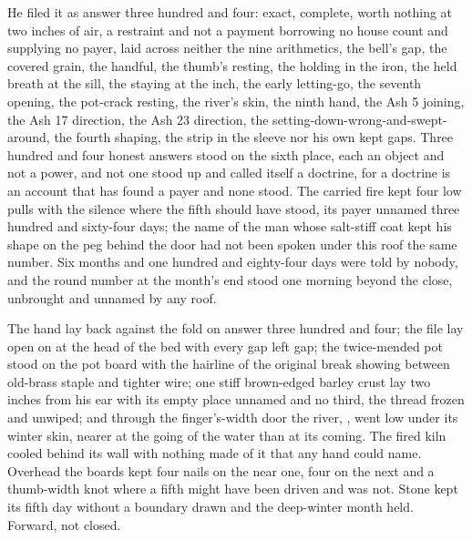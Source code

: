 He filed it as answer three hundred and four: exact, complete, worth nothing at two inches of air, a restraint and not a payment borrowing no house count and supplying no payer, laid across neither the nine arithmetics, the bell's gap, the covered grain, the handful, the thumb's resting, the holding in the iron, the held breath at the sill, the staying at the inch, the early letting-go, the seventh opening, the pot-crack resting, the river's skin, the ninth hand, the Ash 5 joining, the Ash 17 direction, the Ash 23 direction, the setting-down-wrong-and-swept-around, the fourth shaping, the strip in the sleeve nor his own kept gaps. Three hundred and four honest answers stood on the sixth place, each an object and not a power, and not one stood up and called itself a doctrine, for a doctrine is an account that has found a payer and none stood. The carried fire kept four low pulls with the silence where the fifth should have stood, its payer unnamed three hundred and sixty-four days; the name of the man whose salt-stiff coat kept his shape on the peg behind the door had not been spoken under this roof the same number. Six months and one hundred and eighty-four days were told by nobody, and the round number at the month's end stood one morning beyond the close, unbrought and unnamed by any roof.

The hand lay back against the fold on answer three hundred and four; the file lay open on  at the head of the bed with every gap left gap; the twice-mended pot stood on the pot board with the hairline of the original break showing between old-brass staple and tighter wire; one stiff brown-edged barley crust lay two inches from his ear with its empty place unnamed and no third, the thread frozen and unwiped; and through the finger's-width door the river, , went low under its winter skin, nearer at the going of the water than at its coming. The fired kiln cooled behind its wall with nothing made of it that any hand could name. Overhead the boards kept four nails on the near one, four on the next and a thumb-width knot where a fifth might have been driven and was not. Stone kept its fifth day without a boundary drawn and the deep-winter month held. Forward, not closed.
